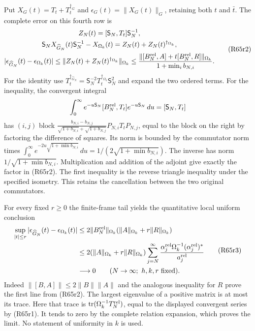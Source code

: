 Put $X_G(t)=T_t+T_t^{\dagger_G}$ and
$\epsilon_G(t)=\|X_G(t)\|_G$, retaining both $t$ and $\bar t$.
The complete error on this fourth row is
\[
\begin{gathered}
 Z_N(t)=[\mathsf S_N,T_t]\mathsf S_N^{-1},\\
 \mathsf S_NX_{\widehat G_N}(t)\mathsf S_N^{-1}
      -X_{\Omega_k}(t)=Z_N(t)+Z_N(t)^{\dagger_{\Omega_k}},\\
 |\epsilon_{\widehat G_N}(t)-\epsilon_{\Omega_k}(t)|
 \leq\|Z_N(t)+Z_N(t)^{\dagger_{\Omega_k}}\|_{\Omega_k}
 \leq\frac{\|[B_N^{\rm rel},A]+t[B_N^{\rm rel},R]\|_{\Omega_k}}
                     {1+\min_i b_{N,i}}.
\end{gathered}\tag{R65r2}
\]
For the identity use
$T_t^{\dagger_{\widehat G_N}}
=\mathsf S_N^{-2}T_t^{\dagger_{\Omega_k}}\mathsf S_N^2$
and expand the two ordered terms. For the inequality, the
convergent integral
\[
 \int_0^\infty e^{-u\mathsf S_N}[B_N^{\rm rel},T_t]
                         e^{-u\mathsf S_N}\,du
   =[\mathsf S_N,T_t]
\]
has $(i,j)$ block
$\frac{b_{N,i}-b_{N,j}}{\sqrt{1+b_{N,i}}+\sqrt{1+b_{N,j}}}
P_{N,i}T_tP_{N,j}$, equal to the block on the right by
factoring the difference of squares. Its norm is bounded by
the commutator norm times
$\int_0^\infty e^{-2u\sqrt{1+\min b_{N,i}}}\,du
=1/(2\sqrt{1+\min b_{N,i}})$.
The inverse has norm $1/\sqrt{1+\min b_{N,i}}$.
Multiplication and addition of the adjoint give exactly the
factor in (R65r2). The first inequality is the reverse triangle
inequality under the specified isometry. This retains the
cancellation between the two original commutators.

For every fixed $r\geq0$ the finite-frame tail yields the
quantitative local uniform conclusion
\[
\begin{aligned}
 \sup_{|t|\leq r}
 |\epsilon_{\widehat G_N}(t)-\epsilon_{\Omega_k}(t)|
 &\leq 2\|B_N^{\rm rel}\|_{\Omega_k}
                    (\|A\|_{\Omega_k}+r\|R\|_{\Omega_k})\\
 &\leq2(\|A\|_{\Omega_k}+r\|R\|_{\Omega_k})
 \sum_{j=N}^{\infty}
 \frac{\alpha_j^{\rm rel}\Omega_k^{-1}(\alpha_j^{\rm rel})^*}
      {a_j^{\rm rel}}\\
 &\longrightarrow0\qquad(N\to\infty;\ h,k,r\text{ fixed}).
\end{aligned}\tag{R65r3}
\]
Indeed $\|[B,A]\|\leq2\|B\|\|A\|$ and the analogous
inequality for $R$ prove the first line from (R65r2).
The largest eigenvalue of a positive matrix is at most its
trace. Here that trace is
$\operatorname{tr}(\Omega_k^{-1}T_N^{\rm rel})$, equal to the
displayed convergent series by (R65r1). It tends to zero by
the complete relation expansion, which proves the limit.
No statement of uniformity in $k$ is used.

